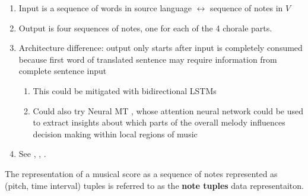 \begin{enumerate}
\begin{enumerate}
\begin{figure}[htpb]
                \end{figure}
            \item Input is a sequence of words in source language $\leftrightarrow$
                sequence of notes in $V$
            \item Output is four sequences of notes, one for each of the 4 chorale parts.
            \item Architecture difference: output only starts after input is completely
                consumed because first word of translated sentence may require information
                from complete sentence input
                \begin{enumerate}
                    \item This could be mitigated with bidirectional LSTMs \cite{Graves2005}
                    \item Could also try Neural MT \cite{Bahdanau2015}, whose attention
                        neural network could be used to extract insights about which parts
                        of the overall melody influences decision making within local regions
                        of music
                \end{enumerate}
            \item See \cite{Liu2014}, \cite{Auli2013}, \cite{Sutskever2014}.
        \end{enumerate}
\end{enumerate}


The representation of a musical score as a sequence of notes represented as
(pitch, time interval) tuples is referred to as the \textbf{note tuples} data
representaiton.
